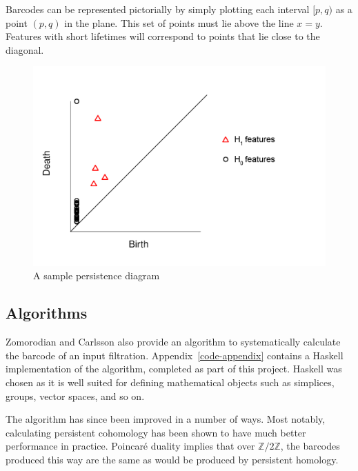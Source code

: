 Barcodes can be represented pictorially by simply plotting each interval $[p, q)$ as a point $(p, q)$ in the plane. This set of points must lie above the line $x = y$. Features with short lifetimes will correspond to points that lie close to the diagonal.

\begin{figure}
\centering
\includegraphics[scale=0.3]{diagram.png}

\caption{A sample persistence diagram}
\label{fig:examplediagram}
\end{figure}

\subsection{Algorithms}

Zomorodian and Carlsson also provide an algorithm to systematically calculate the barcode of an input filtration. Appendix~\ref{code-appendix} contains a Haskell implementation of the algorithm, completed as part of this project. Haskell was chosen as it is well suited for defining mathematical objects such as simplices, groups, vector spaces, and so on.

The algorithm has since been improved in a number of ways. Most notably, calculating persistent cohomology \cite{de2011dualities} has been shown to have much better performance in practice. Poincar\'e duality implies that over $\mathbb{Z}/2\mathbb{Z}$, the barcodes produced this way are the same as would be produced by persistent homology.